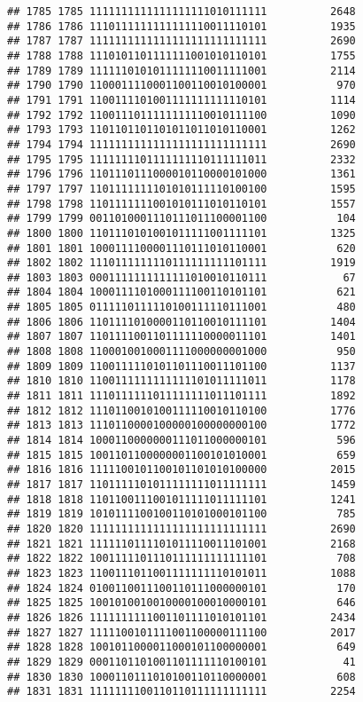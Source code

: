 \documentclass[]{article}
\begin{document}
\begin{verbatim}
## 1785 1785 1111111111111111111010111111          2648
## 1786 1786 1110111111111111110011110101          1935
## 1787 1787 1111111111111111111111111111          2690
## 1788 1788 1110101101111111001010110101          1755
## 1789 1789 1111110101011111110011111001          2114
## 1790 1790 1100011110001100110010100001           970
## 1791 1791 1100111101001111111111110101          1114
## 1792 1792 1100111011111111110010111100          1090
## 1793 1793 1101101101101011011010110001          1262
## 1794 1794 1111111111111111111111111111          2690
## 1795 1795 1111111101111111110111111011          2332
## 1796 1796 1101110111000010110000101000          1361
## 1797 1797 1101111111101010111110100100          1595
## 1798 1798 1101111111001010111010110101          1557
## 1799 1799 0011010001110111011100001100           104
## 1800 1800 1101110101001011111001111101          1325
## 1801 1801 1000111100001110111010110001           620
## 1802 1802 1110111111110111111111101111          1919
## 1803 1803 0001111111111111010010110111            67
## 1804 1804 1000111101000111100110101101           621
## 1805 1805 0111110111110100111110111001           480
## 1806 1806 1101111010000110110010111101          1404
## 1807 1807 1101111001101111110000011101          1401
## 1808 1808 1100010010001111000000001000           950
## 1809 1809 1100111110101101110011101100          1137
## 1810 1810 1100111111111111101011111011          1178
## 1811 1811 1110111111011111111011101111          1892
## 1812 1812 1110110010100111110010110100          1776
## 1813 1813 1110110000100000100000000100          1772
## 1814 1814 1000110000000111011000000101           596
## 1815 1815 1001101100000001100101010001           659
## 1816 1816 1111100101100101101010100000          2015
## 1817 1817 1101111101011111111011111111          1459
## 1818 1818 1101100111001011111011111101          1241
## 1819 1819 1010111100100110101000101100           785
## 1820 1820 1111111111111111111111111111          2690
## 1821 1821 1111110111101011110011101001          2168
## 1822 1822 1001111101110111111111111101           708
## 1823 1823 1100111011001111111110101011          1088
## 1824 1824 0100110011100110111000000101           170
## 1825 1825 1001010010010000100010000101           646
## 1826 1826 1111111111001101111010101101          2434
## 1827 1827 1111100101111001100000111100          2017
## 1828 1828 1001011000011000101100000001           649
## 1829 1829 0001101101001101111110100101            41
## 1830 1830 1000110111010100110110000001           608
## 1831 1831 1111111100110110111111111111          2254

\end{verbatim}
\end{document}
